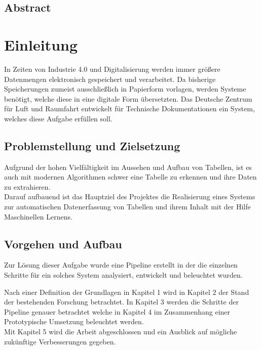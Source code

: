 \documentclass[
]{article}
\author{}
\date{}
\begin{document}
\hypertarget{header-n0}{%
\subsection{Abstract}\label{header-n0}}

\hypertarget{header-n2}{%
\section{Einleitung}\label{header-n2}}

In Zeiten von Industrie 4.0 und Digitalisierung werden immer größere
Datenmengen elektronisch gespeichert und verarbeitet. Da bisherige
Speicherungen zumeist ausschließlich in Papierform vorlagen, werden
Systeme benötigt, welche diese in eine digitale Form übersetzten. Das
Deutsche Zentrum für Luft und Raumfahrt entwickelt für Technische
Dokumentationen ein System, welches diese Aufgabe erfüllen soll.

\hypertarget{header-n4}{%
\subsection{Problemstellung und Zielsetzung}\label{header-n4}}

Aufgrund der hohen Vielfältigkeit im Aussehen und Aufbau von Tabellen,
ist es auch mit modernen Algorithmen schwer eine Tabelle zu erkennen und
ihre Daten zu extrahieren. \\
Darauf aufbauend ist das Hauptziel des Projektes die Realisierung eines
Systems zur automatischen Datenerfassung von Tabellen und ihrem Inhalt
mit der Hilfe Maschinellen Lernens.

\hypertarget{header-n6}{%
\subsection{Vorgehen und Aufbau}\label{header-n6}}

Zur Lösung dieser Aufgabe wurde eine Pipeline erstellt in der die
einzelnen Schritte für ein solches System analysiert, entwickelt und
beleuchtet wurden.

Nach einer Definition der Grundlagen in Kapitel 1 wird in Kapitel 2 der
Stand der bestehenden Forschung betrachtet. In Kapitel 3 werden die
Schritte der Pipeline genauer betrachtet welche in Kapitel 4 im
Zusammenhang einer Prototypische Umsetzung beleuchtet werden.\\
Mit Kapitel 5 wird die Arbeit abgeschlossen und ein Ausblick auf
mögliche zukünftige Verbesserungen gegeben.
\end{document}
